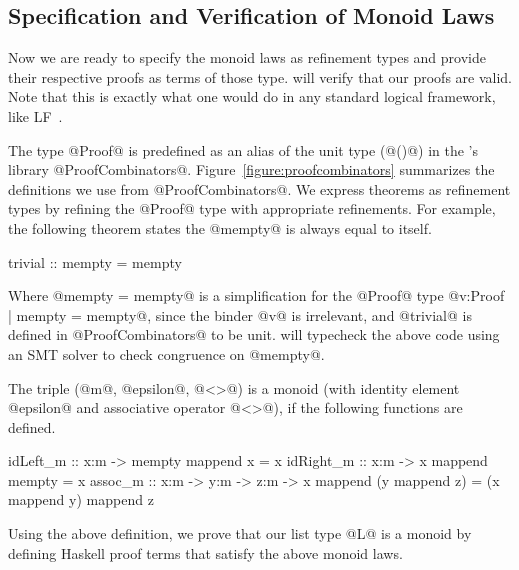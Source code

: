 \subsection{Specification and Verification of Monoid Laws}

Now we are ready to specify the monoid laws as refinement types and
provide their respective proofs as terms of those type. \toolname
will verify that our proofs are valid. 
%
Note that this is exactly what
one would do in any standard logical framework,
like LF~\cite{Harper93}.

The type @Proof@ is predefined as an alias of the unit type (@()@)
in the \toolname's library @ProofCombinators@.
Figure~\ref{figure:proofcombinators} summarizes the definitions we use from @ProofCombinators@.
%
We express theorems as refinement types by refining
the @Proof@ type with appropriate refinements.
%
For example, the following theorem states
the @mempty@ is always equal to itself.
\begin{code}
  trivial :: {mempty = mempty}
\end{code}
%
Where @{mempty = mempty}@ is a simplification for the @Proof@ type
@{v:Proof | mempty = mempty}@, since the binder @v@ is irrelevant, and
@trivial@ is defined in @ProofCombinators@ to be unit.
%
\toolname will typecheck the above code using an SMT
solver to check congruence on @mempty@.
%

\begin{definition}[Monoid] \label{definition:monoid}
The triple (@m@, @epsilon@, @<>@) is a monoid
(with identity element @epsilon@ and associative operator @<>@),
if the following functions are defined. %
%
\begin{code}
  idLeft_m  :: x:m -> {mempty mappend x = x}
  idRight_m :: x:m -> {x mappend mempty = x}
  assoc_m   :: x:m -> y:m -> z:m -> {x mappend (y mappend z) = (x mappend y) mappend z}
\end{code}
\end{definition}
%
Using the above definition, we prove that our list type @L@ is a monoid
by defining Haskell proof terms that satisfy the above monoid laws. 

